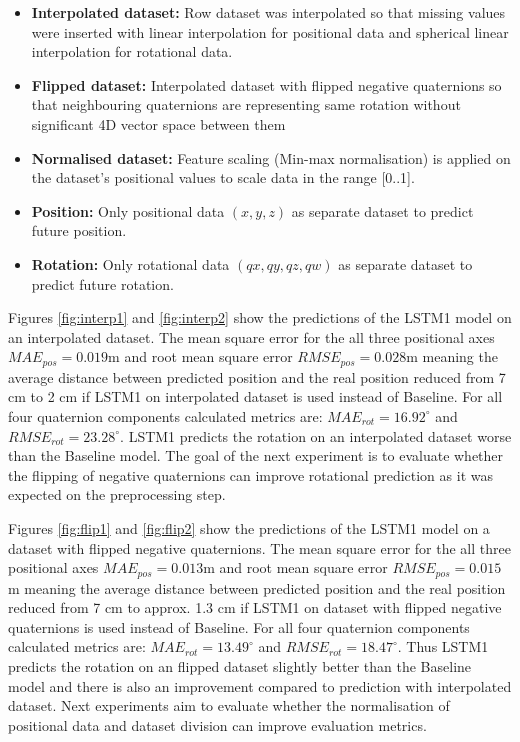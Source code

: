 \begin{itemize}
	\item \textbf{Interpolated dataset:} Row dataset was interpolated so that missing values were inserted with linear interpolation for positional data and spherical linear interpolation for rotational data. 
	\item \textbf{Flipped dataset:} Interpolated dataset with flipped negative quaternions so that neighbouring quaternions are representing same rotation without significant 4D vector space between them
	\item \textbf{Normalised dataset:} Feature scaling (Min-max normalisation) is applied on the dataset's positional values to scale data in the range [0..1]. 
	\item \textbf{Position:} Only positional data $(x, y, z)$ as separate dataset to predict future position. 
	\item \textbf{Rotation:} Only rotational data $(qx, qy, qz, qw)$ as separate dataset to predict future rotation. 
	
\end{itemize}



Figures \ref{fig:interp1} and \ref{fig:interp2} show the predictions of the LSTM1 model on an interpolated dataset. The mean square error for the all three positional axes $MAE_{pos} = 0.019$m and root mean square error  $RMSE_{pos} = 0.028$m meaning the average distance between predicted position and the real position reduced from 7 cm to 2 cm if LSTM1 on interpolated dataset is used instead of Baseline. For all four quaternion components calculated metrics  are: $MAE_{rot} = 16.92^{\circ}$ and $RMSE_{rot}  =23.28^{\circ}$. LSTM1 predicts the rotation on an interpolated dataset worse than the Baseline model. The goal of the next experiment is to evaluate whether the flipping of negative quaternions can improve rotational prediction as it was expected on the preprocessing step.

Figures \ref{fig:flip1} and \ref{fig:flip2} show the predictions of the LSTM1 model on a dataset with flipped negative quaternions. The mean square error for the all three positional axes $MAE_{pos} = 0.013$m and root mean square error  $RMSE_{pos} = 0.015$m meaning the average distance between predicted position and the real position reduced from 7 cm to approx. 1.3 cm if LSTM1 on dataset with flipped negative quaternions is used instead of Baseline. For all four quaternion components calculated metrics are: $MAE_{rot} = 13.49^{\circ}$ and $RMSE_{rot}  =18.47^{\circ}$. Thus LSTM1 predicts the rotation on an flipped dataset slightly better than the Baseline model and there is also an improvement compared to prediction with interpolated dataset. Next experiments aim to evaluate whether the normalisation of positional data and dataset division can improve evaluation metrics. 

